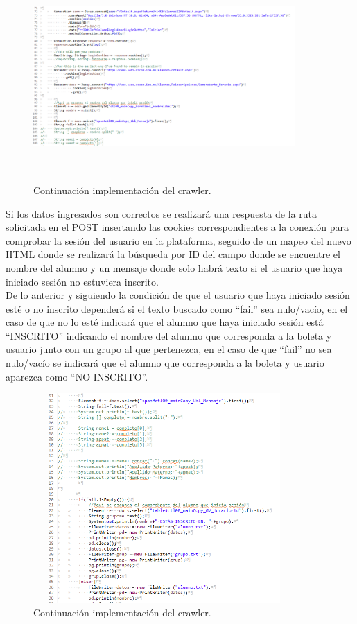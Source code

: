 	\begin{figure} [hbt!]
		\centering
		\includegraphics[width=10cm, height=8cm]{Imagenes/Crawler/Codigo3}
		\caption{Continuación implementación del crawler.}
		\label{codigo3}
	\end{figure}
	\pagebreak
	
	\noindent Si los datos ingresados son correctos se realizará una respuesta de la ruta solicitada en el POST insertando las cookies correspondientes a la conexión para comprobar la sesión del usuario en la plataforma, seguido de un mapeo del nuevo HTML donde se realizará la búsqueda por ID del campo donde se encuentre el nombre del alumno y un mensaje donde solo habrá texto si el usuario que haya iniciado sesión no estuviera inscrito.\\
	\noindent De lo anterior y siguiendo la condición de que el usuario que haya iniciado sesión esté o no inscrito dependerá si el texto buscado como “fail” sea nulo/vacío, en el caso de que no lo esté indicará que el alumno que haya iniciado sesión está “INSCRITO” indicando el nombre del alumno que corresponda a la boleta y usuario junto con un grupo al que pertenezca, en el caso de que “fail” no sea nulo/vacío se indicará que el alumno que corresponda a la boleta y usuario aparezca como “NO INSCRITO”. \\
	\begin{figure}[hbt!]
		\centering
		\includegraphics[width=10cm, height=8cm]{Imagenes/Crawler/Codigo4}
		\caption{Continuación implementación del crawler.}
		\label{codigo4}
	\end{figure}
	
